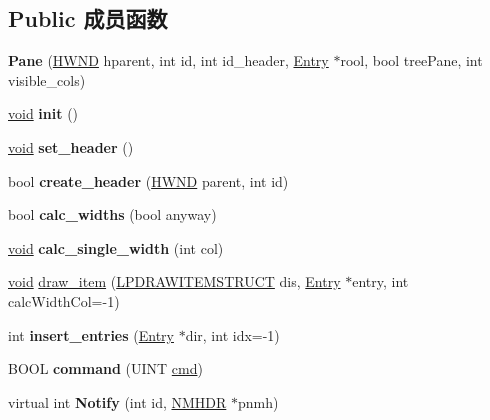 \subsection*{Public 成员函数}
\begin{DoxyCompactItemize}
\item 
\mbox{\label{struct_pane_a8d086c53b6e408f1fbfcd42f7b767e7f}} 
{\bfseries Pane} (\hyperlink{interfacevoid}{H\+W\+ND} hparent, int id, int id\+\_\+header, \hyperlink{struct_entry}{Entry} $\ast$rool, bool tree\+Pane, int visible\+\_\+cols)
\item 
\mbox{\label{struct_pane_ae17ca20a0b38371cb8f9f2cac7ed58f0}} 
\hyperlink{interfacevoid}{void} {\bfseries init} ()
\item 
\mbox{\label{struct_pane_accedb30c07a20bd58bd13ac2f07d0521}} 
\hyperlink{interfacevoid}{void} {\bfseries set\+\_\+header} ()
\item 
\mbox{\label{struct_pane_a29981f7ecb4025e961b738aa8f6a67d8}} 
bool {\bfseries create\+\_\+header} (\hyperlink{interfacevoid}{H\+W\+ND} parent, int id)
\item 
\mbox{\label{struct_pane_a4594c791a1cf51c84322d2b4258a5965}} 
bool {\bfseries calc\+\_\+widths} (bool anyway)
\item 
\mbox{\label{struct_pane_ae10c68d222b492264aded5579dd007a5}} 
\hyperlink{interfacevoid}{void} {\bfseries calc\+\_\+single\+\_\+width} (int col)
\item 
\hyperlink{interfacevoid}{void} \hyperlink{struct_pane_a75554c9e14ed5de1efc75a5e9da6b6b9}{draw\+\_\+item} (\hyperlink{structtag_d_r_a_w_i_t_e_m_s_t_r_u_c_t}{L\+P\+D\+R\+A\+W\+I\+T\+E\+M\+S\+T\+R\+U\+CT} dis, \hyperlink{struct_entry}{Entry} $\ast$entry, int calc\+Width\+Col=-\/1)
\item 
\mbox{\label{struct_pane_a4388f18dd63f1819e425175c95dcec00}} 
int {\bfseries insert\+\_\+entries} (\hyperlink{struct_entry}{Entry} $\ast$dir, int idx=-\/1)
\item 
\mbox{\label{struct_pane_a1febb0653b3fb374ef7b7b04791c6321}} 
B\+O\+OL {\bfseries command} (U\+I\+NT \hyperlink{structcmd}{cmd})
\item 
\mbox{\label{struct_pane_a26276448670a79c7568534297363016a}} 
virtual int {\bfseries Notify} (int id, \hyperlink{structtag_n_m_h_d_r}{N\+M\+H\+DR} $\ast$pnmh)
\end{DoxyCompactItemize}
